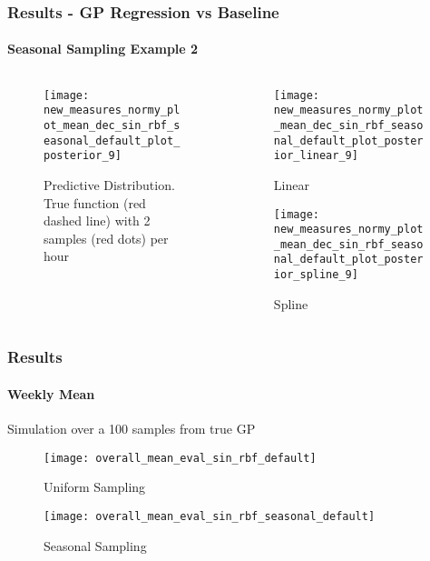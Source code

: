 \documentclass[
	8pt, %
]{beamer}
\begin{document}
\begin{frame}
	\frametitle{Results - GP Regression vs Baseline}
	\framesubtitle{Seasonal Sampling Example 2}

	\begin{columns}[c] %
		\begin{column}{0.5\textwidth} %
				\begin{figure}
					\texttt{[image: new\_measures\_normy\_plot\_mean\_dec\_sin\_rbf\_seasonal\_default\_plot\_posterior\_9]}
					\caption{Predictive Distribution. True function (red dashed line) with 2 samples (red dots) per hour}
				\end{figure}
		\end{column}
		\begin{column}{0.5\textwidth} %
				\begin{figure}
					\texttt{[image: new\_measures\_normy\_plot\_mean\_dec\_sin\_rbf\_seasonal\_default\_plot\_posterior\_linear\_9]}
					\caption{Linear}
				\end{figure}

				\begin{figure}
					\texttt{[image: new\_measures\_normy\_plot\_mean\_dec\_sin\_rbf\_seasonal\_default\_plot\_posterior\_spline\_9]}
					\caption{Spline}
				\end{figure}
		\end{column}
	\end{columns}

\end{frame}

\begin{frame}
	\frametitle{Results}
	\framesubtitle{Weekly Mean} %

	Simulation over a 100 samples from true GP

	\begin{figure}
			\texttt{[image: overall\_mean\_eval\_sin\_rbf\_default]}
			\caption{Uniform Sampling}
	\end{figure}

	\begin{figure}
			\texttt{[image: overall\_mean\_eval\_sin\_rbf\_seasonal\_default]}
			\caption{Seasonal Sampling}
	\end{figure}

\end{frame}
\end{document}
